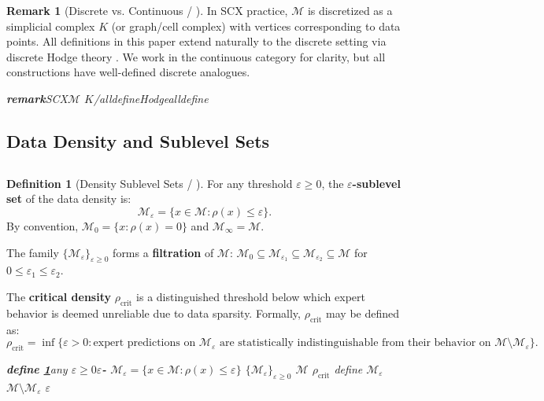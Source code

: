 \documentclass[11pt,a4paper]{article}
\theoremstyle{plain}
\theoremstyle{definition}
\newtheorem{definition}[theorem]{Definition}
\newtheorem{remark}[theorem]{Remark}
\newcommand{\cM}{\mathcal{M}}
\begin{document}
\begin{remark}[Discrete vs. Continuous / ]
In SCX practice, $\cM$ is discretized as a simplicial complex $K$ (or 
graph/cell complex) with vertices corresponding to data points. All 
definitions in this paper extend naturally to the discrete setting via 
discrete Hodge theory \cite{scx_hodge}. We work in the continuous category 
for clarity, but all constructions have well-defined discrete analogues.
\end{remark}

\bigskip
\noindent
\textit{\textbf{remark}SCX$\cM$  $K$/alldefineHodgealldefine}

\subsection{Data Density and Sublevel Sets}
\subsection*{}

\begin{definition}[Density Sublevel Sets / ]
\label{def:sublevel}
For any threshold $\varepsilon \geq 0$, the \textbf{$\varepsilon$-sublevel set} 
of the data density is:
\begin{equation}
  \cM_{\varepsilon} = \{x \in \cM : \rho(x) \leq \varepsilon\}.
  \label{eq:sublevel}
\end{equation}
By convention, $\cM_0 = \{x : \rho(x) = 0\}$ and $\cM_{\infty} = \cM$.

The family $\{\cM_{\varepsilon}\}_{\varepsilon \geq 0}$ forms a 
\textbf{filtration} of $\cM$: 
$\cM_0 \subseteq \cM_{\varepsilon_1} \subseteq \cM_{\varepsilon_2} \subseteq \cM$ 
for $0 \leq \varepsilon_1 \leq \varepsilon_2$.

The \textbf{critical density} $\rho_{\text{crit}}$ is a distinguished 
threshold below which expert behavior is deemed unreliable due to data 
sparsity. Formally, $\rho_{\text{crit}}$ may be defined as:
\begin{equation}
  \rho_{\text{crit}} = \inf\{\varepsilon > 0 : \text{expert predictions on } 
    \cM_{\varepsilon} \text{ are statistically indistinguishable from 
    their behavior on } \cM \setminus \cM_{\varepsilon}\}.
  \label{eq:rhocrit}
\end{equation}
\end{definition}

\bigskip
\noindent
\textit{\textbf{define \ref{def:sublevel}}any $\varepsilon \geq 0$\textbf{$\varepsilon$-} $\cM_{\varepsilon} = \{x \in \cM : \rho(x) \leq \varepsilon\}$ $\{\cM_{\varepsilon}\}_{\varepsilon \geq 0}$  $\cM$ \textbf{}\textbf{} $\rho_{\text{crit}}$ define $\cM_{\varepsilon}$  $\cM \setminus \cM_{\varepsilon}$  $\varepsilon$}
\end{document}
